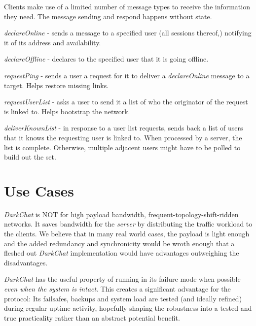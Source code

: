 \documentclass[11pt]{article}
\begin{document}
Clients make use of a limited number of message types to receive the information they need. The message sending and respond happens without state.

\begin{description}
\item \emph{declareOnline} - sends a message to a specified user (all sessions thereof,) notifying it of its address and availability.
\item \emph{declareOffline} - declares to the specified user that it is going offline.
\item \emph{requestPing} - sends a user a request for it to deliver a \emph{declareOnline} message to a target. Helps restore missing links.
\item \emph{requestUserList} - asks a user to send it a list of who the originator of the request is linked to. Helps bootstrap the network.
\item \emph{deliverKnownList} - in response to a user list requests, sends back a list of users that it knows the requesting user is linked to. When processed by a server, the list is complete. Otherwise, multiple adjacent users might have to be polled to build out the set.
\end{description}

\section{Use Cases}

\emph{DarkChat} is NOT for high payload bandwidth, frequent-topology-shift-ridden networks. It saves bandwidth for the \emph{server} by distributing the traffic workload to the clients. We believe that in many real world cases, the payload is light enough and the added redundancy and synchronicity would be wroth enough that a fleshed out \emph{DarkChat} implementation would have advantages outweighing the disadvantages.

\emph{DarkChat} has the useful property of running in its failure mode when possible \emph{even when the system is intact}. This creates a significant advantage for the protocol: Its failsafes, backups and system load are tested (and ideally refined) during regular uptime activity, hopefully shaping the robustness into a tested and true practicality rather than an abstract potential benefit.
\end{document}
